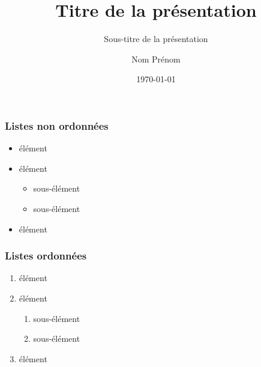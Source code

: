\documentclass[
    9pt, aspectratio = 169,
    xcolor = {dvipsnames},
    hyperref = {pdftex, pdfpagemode=UseNone, hidelinks, pdfdisplaydoctitle=true},
    usepdftitle = false
]{beamer}
\title{Titre de la présentation} %
\subtitle{Sous-titre de la présentation} %
\author{Nom Prénom} %
\date{\today} %
\begin{document}
\titleframe

\begin{frame}
    \frametitle{Listes non ordonnées}
    \begin{itemize}
        \item élément
        \item élément
        \begin{itemize}
            \item sous-élément
            \item sous-élément
        \end{itemize}
        \item élément
    \end{itemize}
\end{frame}

\begin{frame}
    \frametitle{Listes ordonnées}
    \begin{enumerate}
        \item élément
        \item élément
        \begin{enumerate}
            \item sous-élément
            \item sous-élément
        \end{enumerate}
        \item élément
    \end{enumerate}
\end{frame}


\end{document}
